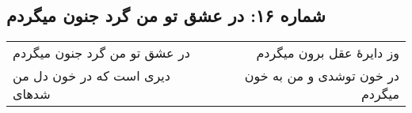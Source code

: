 \begin{center}
\section*{شماره ۱۶: در عشق تو من گرد جنون میگردم}
\label{sec:016}
\begin{longtable}{l p{0.5cm} r}
در عشق تو من گرد جنون میگردم
&&
وز دایرهٔ عقل برون میگردم
\\
دیری است که در خون دل من شدهای
&&
در خون توشدی و من به خون میگردم
\\
\end{longtable}
\end{center}
